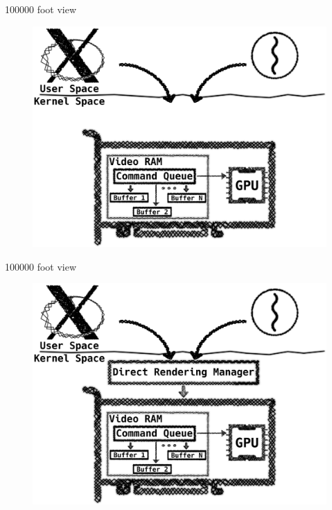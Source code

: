 \documentclass[10pt, compress, aspectratio=169]{beamer}
\begin{document}
\begin{frame}{100000 foot view}
  \begin{figure}
    \centering
    \includegraphics[width=\linewidth,
                     height=0.8\textheight,
                     keepaspectratio]{with_drm_4}
  \end{figure}
\end{frame}

\begin{frame}{100000 foot view}
  \begin{figure}
    \centering
    \includegraphics[width=\linewidth,
                     height=0.8\textheight,
                     keepaspectratio]{with_drm_5}
  \end{figure}
\end{frame}
\end{document}
